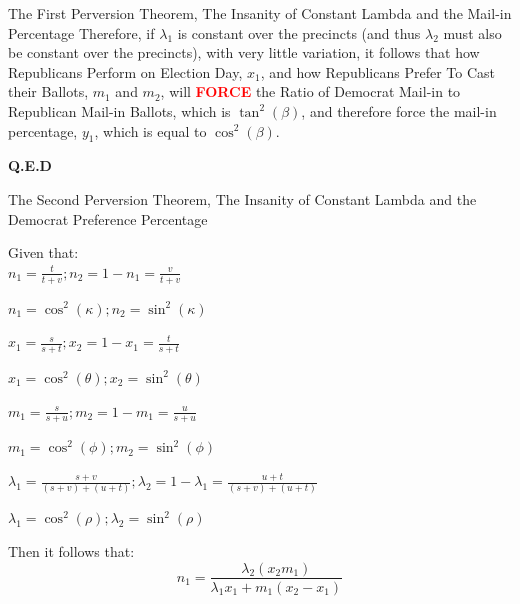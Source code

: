 \begin{theorem}{The First Perversion Theorem, The Insanity of Constant Lambda and the Mail-in Percentage}
Therefore, if $\lambda_{1}$ is constant over the precincts (and thus $\lambda_{2}$ must also be constant over the precincts), with very little variation, it follows that how Republicans Perform on Election Day, $x_{1}$, and how Republicans Prefer To Cast their Ballots, $m_{1}$ and $m_{2}$, will \textbf{\textcolor{red}{FORCE}} the Ratio of Democrat Mail-in to Republican Mail-in Ballots, which is $\tan^{2}(\beta)$, and therefore force the mail-in percentage, $y_{1}$, which is equal to $\cos^{2}(\beta)$.
\begin{flushright}
\textbf{Q.E.D}
\end{flushright}
\end{theorem}
\newpage
\begin{theorem}{The Second Perversion Theorem, The Insanity of Constant Lambda and the Democrat Preference Percentage}

Given that:\\
$n_{1}=\frac{t}{t+v};n_{2}=1-n_{1}=\frac{v}{t+v}$

$n_{1}=\cos^{2}(\kappa); n_{2}=\sin^{2}(\kappa)$

$x_{1}=\frac{s}{s+t};x_{2}=1-x_{1}=\frac{t}{s+t}$

$x_{1}=\cos^{2}(\theta); x_{2}=\sin^{2}(\theta)$

$m_{1}=\frac{s}{s+u};m_{2}=1-m_{1}=\frac{u}{s+u}$

$m_{1}=\cos^{2}(\phi); m_{2}=\sin^{2}(\phi)$

$\lambda_{1}=\frac{s+v}{(s+v)+(u+t)};\lambda_{2}=1-\lambda_{1}=\frac{u+t}{(s+v)+(u+t)}$

$\lambda_{1}=\cos^{2}(\rho); \lambda_{2}=\sin^{2}(\rho)$

Then it follows that:
$$n_{1}=\frac{\lambda_{2}(x_{2}m_{1})}{\lambda_{1}x_{1}+m_{1}(x_{2}-x_{1})}$$


\end{theorem}
